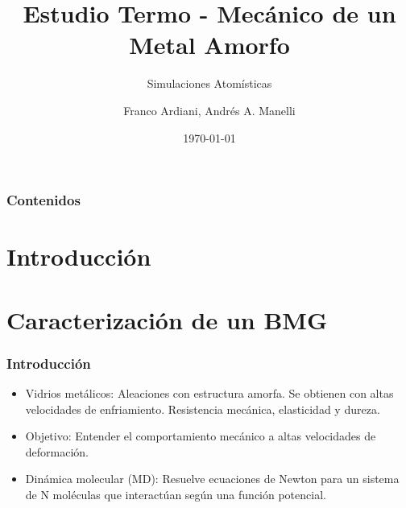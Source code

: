 \documentclass[12pt,t]{beamer}
\title[Estudio de un Metal Amorfo]{Estudio Termo - Mec\'anico de un Metal Amorfo}
\subtitle{Simulaciones Atom\'isticas}
\author[Ardiani, Manelli]{Franco Ardiani, Andr\'es A. Manelli}
\institute[UNCUYO]{Facultad de Ingenier\'ia, Universidad Nacional de Cuyo}
\date{\today}
\begin{document}

\maketitle

\begin{frame}
   \frametitle{Contenidos}
   \tableofcontents[currentsection,sectionstyle=show,subsectionstyle=show/shaded/hide]
\end{frame}


\section[Introducci\'on]{Introducci\'on}

\begin{frame}
 
\end{frame}


\section[Caracterizaci\'on]{Caracterizaci\'on de un BMG}

\begin{frame}
    \frametitle{Introducci\'on}
    \vspace{0.2cm}
    \begin{itemize}
        \item Vidrios met\'alicos: Aleaciones con estructura amorfa. Se obtienen con altas velocidades de enfriamiento. Resistencia mec\'anica, elasticidad y dureza.
        \item Objetivo: Entender el comportamiento mec\'anico a altas velocidades de deformaci\'on.
        \item Din\'amica molecular (MD): Resuelve ecuaciones de Newton para un sistema de N mol\'eculas que interact\'uan seg\'un una funci\'on potencial.
    \end{itemize}
\end{frame}
\end{document}
